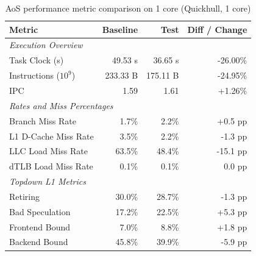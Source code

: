 \begin{table}[htbp]
  \centering
  \caption{AoS performance metric comparison on 1 core (Quickhull, 1 core)}
  \label{tab:perf_comparison_aos_quickhull_1core}
  \begin{tabular}{lrrr}
    \toprule
    \textbf{Metric} & \textbf{Baseline} & \textbf{Test} & \textbf{Diff / Change} \\
    \midrule
    \multicolumn{4}{l}{\textit{Execution Overview}} \\
    \quad Task Clock (s)           & 49.53 s   & 36.65 s   & -26.00\%   \\
    \quad Instructions ($10^9$)    & 233.33 B  & 175.11 B  & -24.95\%   \\
    \quad IPC                      & 1.59       & 1.61       & +1.26\%    \\
    \midrule
    \multicolumn{4}{l}{\textit{Rates and Miss Percentages}} \\
    \quad Branch Miss Rate         & 1.7\%      & 2.2\%      & +0.5 pp    \\
    \quad L1 D-Cache Miss Rate     & 3.5\%      & 2.2\%      & -1.3 pp    \\
    \quad LLC Load Miss Rate       & 63.5\%     & 48.4\%     & -15.1 pp   \\
    \quad dTLB Load Miss Rate      & 0.1\%      & 0.1\%      & 0.0 pp     \\
    \midrule
    \multicolumn{4}{l}{\textit{Topdown L1 Metrics}} \\
    \quad Retiring                 & 30.0\%     & 28.7\%     & -1.3 pp   \\
    \quad Bad Speculation          & 17.2\%     & 22.5\%     & +5.3 pp   \\
    \quad Frontend Bound           & 7.0\%     & 8.8\%     & +1.8 pp   \\
    \quad Backend Bound            & 45.8\%     & 39.9\%     & -5.9 pp   \\
    \bottomrule
  \end{tabular}
\end{table}

